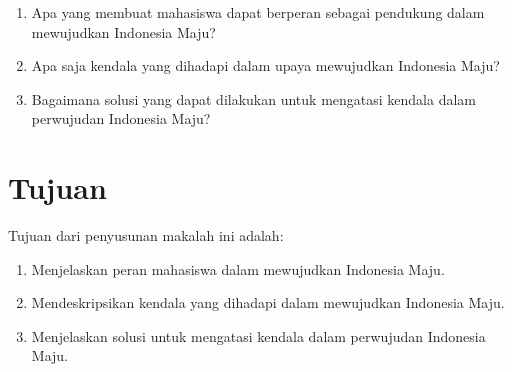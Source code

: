 \begin{enumerate}[nosep]
    \item Apa yang membuat mahasiswa dapat berperan sebagai pendukung dalam mewujudkan Indonesia Maju?
    \item Apa saja kendala yang dihadapi dalam upaya mewujudkan Indonesia Maju?
    \item Bagaimana solusi yang dapat dilakukan untuk mengatasi kendala dalam perwujudan Indonesia Maju?
\end{enumerate}

\section{Tujuan}

Tujuan dari penyusunan makalah ini adalah:

\begin{enumerate}[nosep]
    \item Menjelaskan peran mahasiswa dalam mewujudkan Indonesia Maju.
    \item Mendeskripsikan kendala yang dihadapi dalam mewujudkan Indonesia Maju.
    \item Menjelaskan solusi untuk mengatasi kendala dalam perwujudan Indonesia Maju.
\end{enumerate}